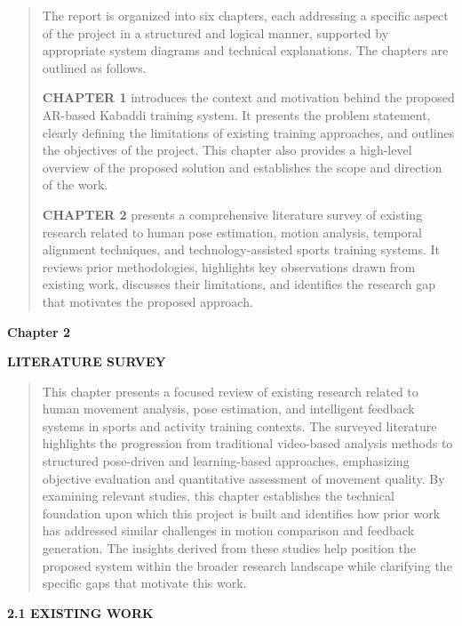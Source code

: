 \documentclass[
]{article}
\begin{document}
\begin{quote}
The report is organized into six chapters, each addressing a specific
aspect of the project in a structured and logical manner, supported by
appropriate system diagrams and technical explanations. The chapters are
outlined as follows.

\textbf{CHAPTER 1} introduces the context and motivation behind the
proposed AR-based Kabaddi training system. It presents the problem
statement, clearly defining the limitations of existing training
approaches, and outlines the objectives of the project. This chapter
also provides a high-level overview of the proposed solution and
establishes the scope and direction of the work.

\textbf{CHAPTER 2} presents a comprehensive literature survey of
existing research related to human pose estimation, motion analysis,
temporal alignment techniques, and technology-assisted sports training
systems. It reviews prior methodologies, highlights key observations
drawn from existing work, discusses their limitations, and identifies
the research gap that motivates the proposed approach.
\end{quote}

\textbf{Chapter 2}

\textbf{LITERATURE SURVEY}

\begin{quote}
This chapter presents a focused review of existing research related to
human movement analysis, pose estimation, and intelligent feedback
systems in sports and activity training contexts. The surveyed
literature highlights the progression from traditional video-based
analysis methods to structured pose-driven and learning-based
approaches, emphasizing objective evaluation and quantitative assessment
of movement quality. By examining relevant studies, this chapter
establishes the technical foundation upon which this project is built
and identifies how prior work has addressed similar challenges in motion
comparison and feedback generation. The insights derived from these
studies help position the proposed system within the broader research
landscape while clarifying the specific gaps that motivate this work.
\end{quote}

\textbf{2.1 EXISTING WORK}
\end{document}
